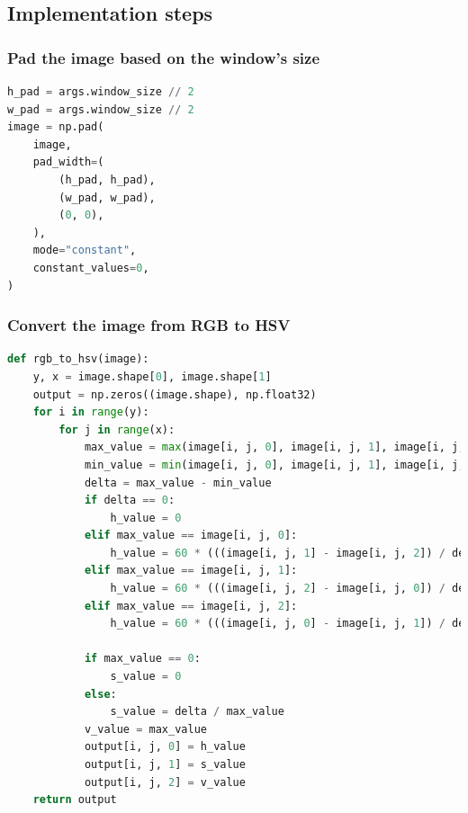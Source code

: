 \documentclass[12pt]{article}
\begin{document}
\subsection{Implementation steps}

\subsubsection{Pad the image based on the window's size}
\begin{lstlisting}[language=Python]
h_pad = args.window_size // 2
w_pad = args.window_size // 2
image = np.pad(
    image,
    pad_width=(
        (h_pad, h_pad),
        (w_pad, w_pad),
        (0, 0),
    ),
    mode="constant",
    constant_values=0,
)
\end{lstlisting}

\subsubsection{Convert the image from RGB to HSV}
\begin{lstlisting}[language=Python]
def rgb_to_hsv(image):
    y, x = image.shape[0], image.shape[1]
    output = np.zeros((image.shape), np.float32)
    for i in range(y):
        for j in range(x):
            max_value = max(image[i, j, 0], image[i, j, 1], image[i, j, 2])
            min_value = min(image[i, j, 0], image[i, j, 1], image[i, j, 2])
            delta = max_value - min_value
            if delta == 0:
                h_value = 0
            elif max_value == image[i, j, 0]:
                h_value = 60 * (((image[i, j, 1] - image[i, j, 2]) / delta) % 6)
            elif max_value == image[i, j, 1]:
                h_value = 60 * (((image[i, j, 2] - image[i, j, 0]) / delta) + 2)
            elif max_value == image[i, j, 2]:
                h_value = 60 * (((image[i, j, 0] - image[i, j, 1]) / delta) + 4)

            if max_value == 0:
                s_value = 0
            else:
                s_value = delta / max_value
            v_value = max_value
            output[i, j, 0] = h_value
            output[i, j, 1] = s_value
            output[i, j, 2] = v_value
    return output
\end{lstlisting}
\end{document}
